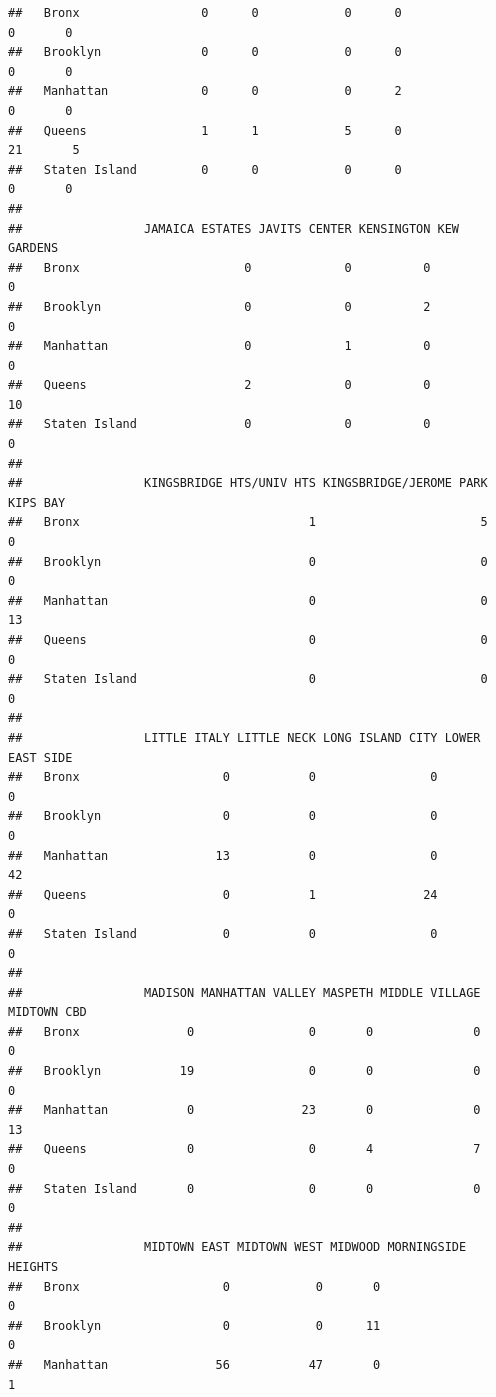\documentclass[
]{article}
\begin{document}
\begin{verbatim}
##   Bronx                 0      0            0      0               0       0
##   Brooklyn              0      0            0      0               0       0
##   Manhattan             0      0            0      2               0       0
##   Queens                1      1            5      0              21       5
##   Staten Island         0      0            0      0               0       0
##                
##                 JAMAICA ESTATES JAVITS CENTER KENSINGTON KEW GARDENS
##   Bronx                       0             0          0           0
##   Brooklyn                    0             0          2           0
##   Manhattan                   0             1          0           0
##   Queens                      2             0          0          10
##   Staten Island               0             0          0           0
##                
##                 KINGSBRIDGE HTS/UNIV HTS KINGSBRIDGE/JEROME PARK KIPS BAY
##   Bronx                                1                       5        0
##   Brooklyn                             0                       0        0
##   Manhattan                            0                       0       13
##   Queens                               0                       0        0
##   Staten Island                        0                       0        0
##                
##                 LITTLE ITALY LITTLE NECK LONG ISLAND CITY LOWER EAST SIDE
##   Bronx                    0           0                0               0
##   Brooklyn                 0           0                0               0
##   Manhattan               13           0                0              42
##   Queens                   0           1               24               0
##   Staten Island            0           0                0               0
##                
##                 MADISON MANHATTAN VALLEY MASPETH MIDDLE VILLAGE MIDTOWN CBD
##   Bronx               0                0       0              0           0
##   Brooklyn           19                0       0              0           0
##   Manhattan           0               23       0              0          13
##   Queens              0                0       4              7           0
##   Staten Island       0                0       0              0           0
##                
##                 MIDTOWN EAST MIDTOWN WEST MIDWOOD MORNINGSIDE HEIGHTS
##   Bronx                    0            0       0                   0
##   Brooklyn                 0            0      11                   0
##   Manhattan               56           47       0                   1

\end{verbatim}
\end{document}
